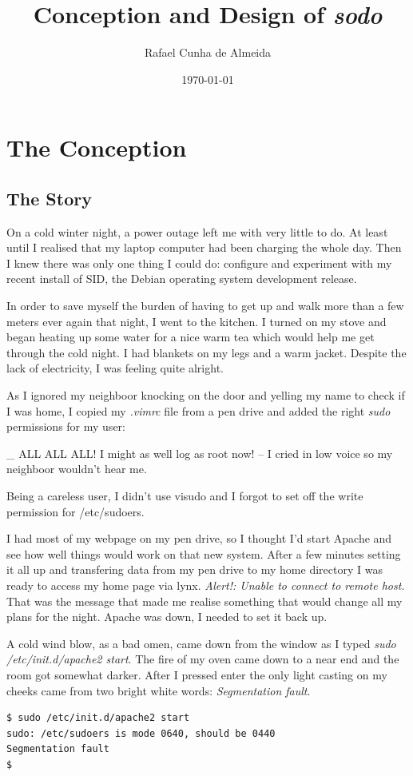 \documentclass{article}
\begin{document}
\title{Conception and Design of \emph{sodo}}
\author{Rafael Cunha de Almeida}
\date{\today}
\maketitle

\section{The Conception}
\subsection{The Story}
On a cold winter night, a power outage left me with very little to do. At least
until I realised that my laptop computer had been charging the whole day. Then I
knew there was only one thing I could do: configure and experiment with my
recent install of SID, the Debian operating system development release.

In order to save myself the burden of having to get up and walk more than a few
meters ever again that night, I went to the kitchen. I turned on my stove and
began heating up some water for a nice warm tea which would help me get through
the cold night. I had blankets on my legs and a warm jacket. Despite the lack of
electricity, I was feeling quite alright.

As I ignored my neighboor knocking on the door and yelling my name to check if I
was home, I copied my \emph{.vimrc} file from a pen drive and added the right
\emph{sudo} permissions for my user:

\_ ALL ALL ALL! I might as well log as root now! -- I cried in low voice so my
neighboor wouldn't hear me.

Being a careless user, I didn't use visudo and I forgot to set off the write
permission for /etc/sudoers.

I had most of my webpage on my pen drive, so I thought I'd start Apache and see
how well things would work on that new system. After a few minutes setting it
all up and transfering data from my pen drive to my home directory I was ready
to access my home page via lynx. \emph{Alert!: Unable to connect to remote
host.} That was the message that made me realise something that would change all
my plans for the night. Apache was down, I needed to set it back up.

A cold wind blow, as a bad omen, came down from the window as I typed \emph{sudo
/etc/init.d/apache2 start}. The fire of my oven came down to a near end and the
room got somewhat darker. After I pressed enter the only light casting on my
cheeks came from two bright white words: \emph{Segmentation fault}.
\begin{verbatim}
$ sudo /etc/init.d/apache2 start
sudo: /etc/sudoers is mode 0640, should be 0440
Segmentation fault
$
\end{verbatim}
\end{document}

